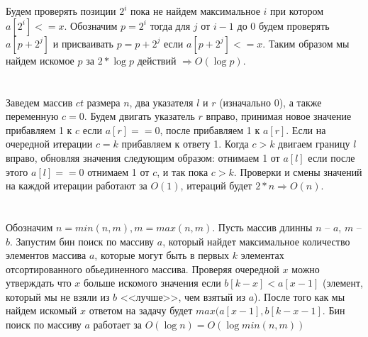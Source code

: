 \documentclass{article}
\begin{document}
\begin{flushleft}

\section{}

Будем проверять позиции $2 ^ i$ пока не найдем максимальное $i$ при котором $a[2 ^ i] <= x$. Обозначим $p = 2 ^ i$ тогда для $j$ от $i - 1$ до $0$ будем проверять $a[p + 2 ^ j]$ и присваивать $p = p + 2 ^ j$ если $a[p + 2 ^ j] <= x$. Таким образом мы найдем искомое $p$ за $2 * \log{p}$ действий $\Rightarrow O(\log{p})$.

\section{}

Заведем массив $ct$ размера $n$, два указателя $l$ и $r$ (изначально 0), а также переменную $c = 0$. Будем двигать указатель $r$ вправо, принимая новое значение прибавляем 1 к $c$ если $a[r] == 0$, после прибавляем 1 к $a[r]$. Если на очередной итерации $c = k$ прибавляем к ответу 1. Когда $c > k$ двигаем границу $l$ вправо, обновляя значения следующим образом: отнимаем 1 от $a[l]$ если после этого $a[l] == 0$ отнимаем 1 от $c$, и так пока $c > k$. Проверки и смены значений на каждой итерации работают за $O(1)$, итераций будет $2 * n \Rightarrow O(n)$.

\section{}

Обозначим $n = min(n, m), m = max(n, m)$. Пусть массив длинны $n$ -- $a$, $m$ -- $b$. Запустим бин поиск по массиву $a$, который найдет максимальное количество элементов массива $a$, которые могут быть в первых $k$ элементах отсортированного обьединенного массива. Проверяя очередной $x$ можно утверждать что $x$ больше искомого значения если $b[k - x] < a[x - 1]$ (элемент, который мы не взяли из $b$ <<лучше>>, чем взятый из $a$). После того как мы найдем искомый $x$ ответом на задачу будет $max(a[x - 1], b[k - x - 1]$. Бин поиск по массиву $a$ работает за $O(\log{n}) = O(\log{min(n, m)})$

\end{flushleft}
\end{document}
